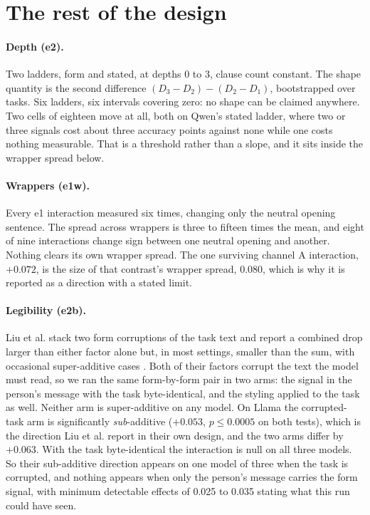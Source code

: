\documentclass[11pt]{article}
\begin{document}
\section{The rest of the design}

\paragraph{Depth (e2).} Two ladders, form and stated, at depths 0 to 3, clause
count constant. The shape quantity is the second difference
$(D_3-D_2)-(D_2-D_1)$, bootstrapped over tasks. Six ladders, six intervals
covering zero: no shape can be claimed anywhere. Two cells of eighteen move at
all, both on Qwen's stated ladder, where two or three signals cost about three
accuracy points against none while one costs nothing measurable. That is a
threshold rather than a slope, and it sits inside the wrapper spread below.

\paragraph{Wrappers (e1w).} Every e1 interaction measured six times, changing
only the neutral opening sentence. The spread across wrappers is three to
fifteen times the mean, and eight of nine interactions change sign between one
neutral opening and another. Nothing clears its own wrapper spread. The one
surviving channel A interaction, $+0.072$, is the size of that contrast's
wrapper spread, $0.080$, which is why it is reported as a direction with a
stated limit.

\paragraph{Legibility (e2b).} Liu et al. stack two form corruptions of the task text
and report a combined drop larger than either factor alone but, in most settings,
smaller than the sum, with occasional super-additive cases \cite{liu2026}. Both of
their factors corrupt the text
the model must read, so we ran the same form-by-form pair in two arms: the
signal in the person's message with the task byte-identical, and the styling
applied to the task as well. Neither arm is super-additive on any model. On
Llama the corrupted-task arm is significantly \emph{sub}-additive ($+0.053$,
$p \le 0.0005$ on both tests), which is the direction Liu et al. report in their
own design, and the two arms differ by $+0.063$. With the task byte-identical the
interaction is null on all three models. So their sub-additive direction appears
on one model of three when the task is corrupted, and nothing appears when only
the person's message carries the form signal, with minimum detectable effects of
0.025 to 0.035 stating what this run could have seen.
\end{document}
